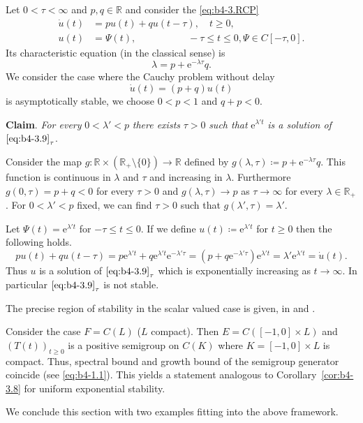 Let $0 < \tau < \infty$ and $p,q \in \mathbb{R}$ and consider the \eqref{eq:b4-3.RCP}
\begin{equation}\label{eq:b4-3.9}
    \begin{aligned}
		\dot{u}(t) &= pu(t) + qu(t-\tau) , \quad t \geq 0 ,\\
		u(t) &= \Psi(t) , \quad\quad\quad\quad\quad\; -\tau \leq t \leq 0 , \Psi \in C[-\tau,0] .
	\end{aligned}
\end{equation}
Its characteristic equation (in the classical sense) is 
\begin{equation}\label{eq:b4-3.10}
 \lambda = p + \mathrm{e}^{-\lambda\tau}q .
\end{equation}
We consider the case where the Cauchy problem without delay
\[
\dot{u}(t) = (p + q)u(t)
\]
is asymptotically stable, \ie we choose $0 < p < 1$ and $q + p < 0$.

\textbf{Claim}.
	\textit{For every} $0 < \lambda' < p$ \textit{there exists} $\tau > 0$ \textit{such that} $\mathrm{e}^{\lambda't}$ \textit{is a solution of} $\eqref{eq:b4-3.9}_{\tau}$.

Consider the map $g \colon \mathbb{R}\times(\mathbb{R}_{+}\setminus\{0\}) \to \mathbb{R}$ defined by $g(\lambda,\tau) \coloneqq p + \mathrm{e}^{-\lambda\tau}q$.
This function is continuous in $\lambda$ and $\tau$ and increasing in $\lambda$.
Furthermore $g(0,\tau) = p + q < 0$ for every $\tau > 0$ and $g(\lambda,\tau) \to p$ as $\tau \to \infty$ for every $\lambda \in \mathbb{R}_{+}$.
For $0 < \lambda' < p$ fixed, we can find $\tau > 0$ such that $g(\lambda',\tau) = \lambda'$.

Let $\Psi(t) = \mathrm{e}^{\lambda't}$ for $-\tau \leq t \leq 0$. 
If we define $u(t) \coloneq \mathrm{e}^{\lambda't}$ for $t \geq 0$ then the following holds.
\[
pu(t) + qu(t-\tau) = p\mathrm{e}^{\lambda't} + q\mathrm{e}^{\lambda't}\mathrm{e}^{-\lambda'\tau} = (p+q\mathrm{e}^{-\lambda'\tau})\mathrm{e}^{\lambda't} = \lambda'\mathrm{e}^{\lambda't} = \dot{u}(t) .
\]
Thus $u$ is a solution of $\eqref{eq:b4-3.9}_{\tau}$ which is exponentially increasing as $t \to \infty$. 
In particular $\eqref{eq:b4-3.9}_{\tau}$ is not stable.

The precise region of stability in the scalar valued case is given, \eg in \citet{hadeler:1978}  and  \citet[p.107ff]{hale:1977}.


\begin{remark*}
	Consider the case $F = C(L)$ ($L$ compact).
	Then $E = C([-1,0] \times L)$ and $(T(t))_{t\geq0}$ is a positive semigroup on $C(K)$ where $K = [-1,0] \times L$ is compact. 
	Thus, spectral bound and growth bound of the semigroup generator coincide (see \eqref{eq:b4-1.1}). 
	This yields a statement analogous to Corollary~\ref{cor:b4-3.8} for uniform exponential stability.
\end{remark*}
We conclude this section with two examples fitting into the above framework.

